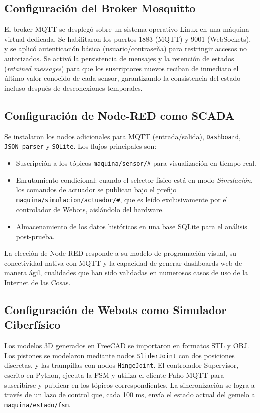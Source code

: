 \subsection{Configuración del Broker Mosquitto}

El broker MQTT se desplegó sobre un sistema operativo Linux en una máquina virtual dedicada. Se habilitaron los puertos 1883 (MQTT) y 9001 (WebSockets), y se aplicó autenticación básica (usuario/contraseña) para restringir accesos no autorizados. Se activó la persistencia de mensajes y la retención de estados (\textit{retained messages}) para que los suscriptores nuevos reciban de inmediato el último valor conocido de cada sensor, garantizando la consistencia del estado incluso después de desconexiones temporales.

\subsection{Configuración de Node-RED como SCADA}

Se instalaron los nodos adicionales para MQTT (entrada/salida), \texttt{Dashboard}, \texttt{JSON parser} y \texttt{SQLite}. Los flujos principales son:
\begin{itemize}
    \item Suscripción a los tópicos \texttt{maquina/sensor/\#} para visualización en tiempo real.
    \item Enrutamiento condicional: cuando el selector físico está en modo \textit{Simulación}, los comandos de actuador se publican bajo el prefijo \texttt{maquina/simulacion/actuador/\#}, que es leído exclusivamente por el controlador de Webots, aislándolo del hardware.
    \item Almacenamiento de los datos históricos en una base SQLite para el análisis post-prueba.
\end{itemize}

La elección de Node-RED responde a su modelo de programación visual, su conectividad nativa con MQTT y la capacidad de generar dashboards web de manera ágil, cualidades que han sido validadas en numerosos casos de uso de la Internet de las Cosas.

\subsection{Configuración de Webots como Simulador Ciberfísico}

Los modelos 3D generados en FreeCAD se importaron en formatos STL y OBJ. Los pistones se modelaron mediante nodos \texttt{SliderJoint} con dos posiciones discretas, y las trampillas con nodos \texttt{HingeJoint}. El controlador Supervisor, escrito en Python, ejecuta la FSM y utiliza el cliente Paho-MQTT para suscribirse y publicar en los tópicos correspondientes. La sincronización se logra a través de un lazo de control que, cada 100 ms, envía el estado actual del gemelo a \texttt{maquina/estado/fsm}.

